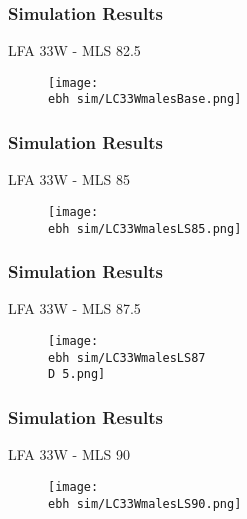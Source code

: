 \documentclass{beamer}
\newcommand{\ebh}{\string~/bio.data/bio.lobster/figures/LFA2733Framework2018/} %
\newcommand{\D}{.}
\begin{document}

\begin{frame}
\frametitle{Simulation Results}
LFA 33W - MLS 82.5
\begin{figure}
        \begin{center}
            \texttt{[image: \\ebh sim/LC33WmalesBase.png]}
        \end{center}
    \end{figure}
\end{frame}



\begin{frame}
\frametitle{Simulation Results}
LFA 33W - MLS 85
\begin{figure}
        \begin{center}
            \texttt{[image: \\ebh sim/LC33WmalesLS85.png]}
        \end{center}
    \end{figure}
\end{frame}


\begin{frame}
\frametitle{Simulation Results}
LFA 33W - MLS 87.5
\begin{figure}
        \begin{center}
            \texttt{[image: \\ebh sim/LC33WmalesLS87\\D 5.png]}
        \end{center}
    \end{figure}
\end{frame}


\begin{frame}
\frametitle{Simulation Results}
LFA 33W - MLS 90
\begin{figure}
        \begin{center}
            \texttt{[image: \\ebh sim/LC33WmalesLS90.png]}
        \end{center}
    \end{figure}
\end{frame}



\end{document}
